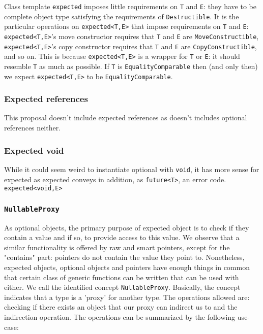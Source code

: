 \documentclass[a4paper,10pt]{article}
\newcommand{\cpp}[1]{\lstinline{#1}}
\begin{document}
Class template \cpp{expected} imposes little requirements on \cpp{T} and \cpp{E}: they have to be  complete object type satisfying the requirements of \cpp{Destructible}. It is the particular operations on \cpp{expected<T,E>} that impose requirements on \cpp{T} and \cpp{E}: \cpp{expected<T,E>}'s move constructor requires that \cpp{T} and \cpp{E} are \cpp{MoveConstructible}, \cpp{expected<T,E>}'s copy constructor requires that \cpp{T} and \cpp{E} are \cpp{CopyConstructible}, and so on. This is because \cpp{expected<T,E>} is a wrapper for \cpp{T} or \cpp{E}: it should resemble \cpp{T} as much as possible. If \cpp{T} is \cpp{EqualityComparable} then (and only then) we expect \cpp{expected<T,E>} to be \cpp{EqualityComparable}. 


\subsubsection{Expected references}

This proposal doesn't include expected references as \cite{optional} doesn't  includes optional references neither.

\subsubsection{Expected void}

While it could seem weird to instantiate optional with \cpp{void}, it has more sense for expected as expected conveys in addition, as \cpp{future<T>},  an error code. \cpp{expected<void,E>} 

\subsubsection{\cpp{NullableProxy}}

As optional objects, the primary purpose of expected object is to check if they contain a value and if so, to provide access to this value. We observe that a similar functionality is offered by raw and smart pointers, except for the "contains" part: pointers do not contain the value they point to. Nonetheless, expected objects, optional objects and pointers have enough things in common that certain class of generic functions can be written that can be used with either. We call the identified concept \cpp{NullableProxy}. Basically, the concept indicates that a type is a 'proxy' for another type. The operations allowed are: checking if there exists an object that our proxy can indirect us to and the indirection operation. The operations can be summarized by the following use-case:
\end{document}
